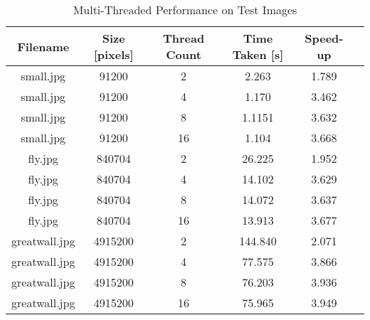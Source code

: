 \begin{table}[h]
\centering
\begin{tabular}{|c|c|c|c|c|c|}
\hline
\textbf{Filename} & \textbf{Size [pixels]} & \textbf{Thread Count} & \textbf{Time Taken [s]} & \textbf{Speed-up}\\
\hline

small.jpg     &  91200   &  2 & 2.263& 1.789\\ \hline
small.jpg     &  91200   &  4 & 1.170& 3.462\\ \hline
small.jpg     &  91200   &  8 & 1.1151&3.632\\ \hline
small.jpg     &  91200   &  16& 1.104 &3.668 \\ \hline
fly.jpg       &  840704  &  2 & 26.225 &1.952\\ \hline
fly.jpg       &  840704  &  4 & 14.102 &3.629\\ \hline
fly.jpg       &  840704  &  8 & 14.072&3.637\\ \hline
fly.jpg       &  840704  &  16& 13.913&3.677 \\ \hline
greatwall.jpg &  4915200 &  2 & 144.840&2.071\\ \hline
greatwall.jpg &  4915200 &  4 & 77.575&3.866\\ \hline
greatwall.jpg &  4915200 &  8 & 76.203&3.936\\ \hline
greatwall.jpg &  4915200 &  16& 75.965&3.949 \\ \hline

\end{tabular}
\caption{Multi-Threaded Performance on Test Images}
\label{tab:comparison}
\end{table}
